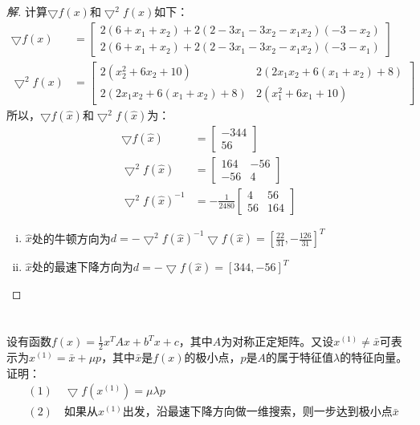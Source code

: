 \documentclass[a4paper]{article}
\begin{document}
\begin{proof}[解]
	计算$\bigtriangledown f(x)$和$\bigtriangledown^2 f(x)$如下：
	\begin{equation}
	\begin{aligned}
	\bigtriangledown f(x)&=\left[
	\begin{array}{c}
	2(6+x_1+x_2)+2(2-3x_1-3x_2-x_1x_2)(-3-x_2) \\
	2(6+x_1+x_2)+2(2-3x_1-3x_2-x_1x_2)(-3-x_1)
	\end{array}
	\right] \\
	\bigtriangledown^2 f(x)&=\left[
	\begin{array}{cc}
	2(x_2^2+6x_2+10) & 2(2x_1x_2+6(x_1+x_2)+8) \\
	2(2x_1x_2+6(x_1+x_2)+8) & 2(x_1^2+6x_1+10)
	\end{array}
	\right]
	\end{aligned}
	\end{equation}
	所以，$\bigtriangledown f(\hat{x})$和$\bigtriangledown^2 f(\hat{x})$为：
	\begin{equation}
	\begin{aligned}
	\bigtriangledown f(\hat{x})&=\left[
	\begin{array}{c}
	-344 \\
	56
	\end{array}
	\right] \\
	\bigtriangledown^2 f(\hat{x})&=\left[
	\begin{array}{cc}
	164 & -56 \\
	-56 & 4
	\end{array}
	\right] \\
	\bigtriangledown^2 f(\hat{x})^{-1}&=-\frac{1}{2480}\left[
	\begin{array}{cc}
	4 & 56 \\
	56 & 164
	\end{array}
	\right]
	\end{aligned} 
	\end{equation}
	
	\begin{enumerate}[(i)]
		\item $\hat{x}$处的牛顿方向为$d=-\bigtriangledown^2f(\hat{x})^{-1}\bigtriangledown f(\hat{x})=\left[\frac{22}{31},-\frac{126}{31}\right]^T$
		\item $\hat{x}$处的最速下降方向为$d=-\bigtriangledown f(\hat{x})=[344,-56]^T$
	\end{enumerate}
\end{proof}

\section{}
设有函数$f(x)=\frac{1}{2}x^TAx+b^Tx+c$，其中$A$为对称正定矩阵。又设$x^{(1)}\ne \bar{x}$可表示为$x^{(1)}=\bar{x}+\mu p$，其中$\bar{x}$是$f(x)$的极小点，$p$是$A$的属于特征值$\lambda$的特征向量。证明：
\begin{equation}
\begin{aligned}
&(1)\quad \bigtriangledown f(x^{(1)})=\mu \lambda p \\
&(2)\quad \mbox{如果从}x^{(1)}\mbox{出发，沿最速下降方向做一维搜索，则一步达到极小点}\bar{x}
\end{aligned}
\end{equation}
\end{document}
